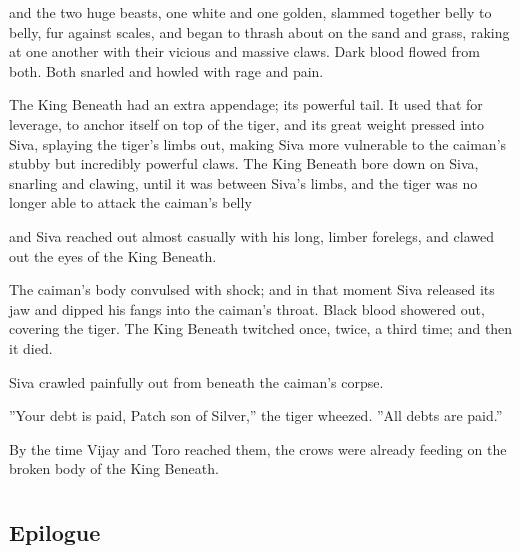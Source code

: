 \documentclass[12pt]{book}
\begin{document}
 and the two huge beasts, one white and one golden, slammed together belly to belly, fur against scales, and began to thrash about on the sand and grass, raking at one another with their vicious and massive claws. Dark blood flowed from both. Both snarled and howled with rage and pain.\par
The King Beneath had an extra appendage; its powerful tail. It used that for leverage, to anchor itself on top of the tiger, and its great weight pressed into Siva, splaying the tiger's limbs out, making Siva more vulnerable to the caiman's stubby but incredibly powerful claws. The King Beneath bore down on Siva, snarling and clawing, until it was between Siva's limbs, and the tiger was no longer able to attack the caiman's belly %
\par
 and Siva reached out almost casually with his long, limber forelegs, and clawed out the eyes of the King Beneath.\par
The caiman's body convulsed with shock; and in that moment Siva released its jaw and dipped his fangs into the caiman's throat. Black blood showered out, covering the tiger. The King Beneath twitched once, twice, a third time; and then it died.\par
Siva crawled painfully out from beneath the caiman's corpse.\par
''Your debt is paid, Patch son of Silver,'' the tiger wheezed. ''All debts are paid.''\par
By the time Vijay and Toro reached them, the crows were already feeding on the broken body of the King Beneath.\par

\chapter{}

\section{Epilogue}
\end{document}
